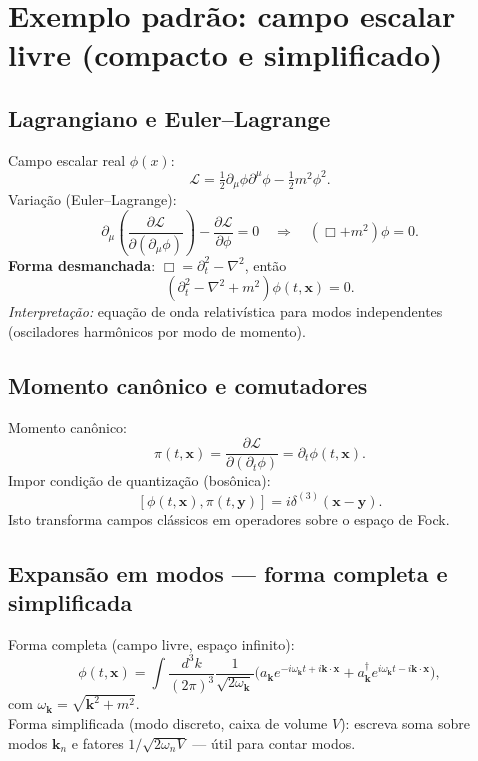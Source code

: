 \documentclass[12pt,a4paper]{article}
\begin{document}
\section{Exemplo padrão: campo escalar livre (compacto e simplificado)}
\subsection{Lagrangiano e Euler--Lagrange}
Campo escalar real $\phi(x)$:
\begin{equation}\label{lag_scalar}
\mathcal{L} = \tfrac12\partial_\mu\phi\partial^\mu\phi - \tfrac12 m^2\phi^2.
\end{equation}
Varia\c{c}\~ao (Euler--Lagrange):
\[ \partial_\mu\left(\frac{\partial\mathcal{L}}{\partial(\partial_\mu\phi)}\right)-\frac{\partial\mathcal{L}}{\partial\phi}=0 \quad\Rightarrow\quad (\Box + m^2)\phi=0. \]
\textbf{Forma desmanchada}: $\Box=\partial_t^2-\nabla^2$, ent\~ao
\[ (\partial_t^2 - \nabla^2 + m^2)\phi(t,\mathbf{x})=0.\]
\textit{Interpreta\c{c}\~ao:} equa\c{c}\~ao de onda relativ\'istica para modos independentes (osciladores harm\^onicos por modo de momento). 

\subsection{Momento canônico e comutadores}
Momento canônico:
\[ \pi(t,\mathbf{x}) = \frac{\partial\mathcal{L}}{\partial(\partial_t\phi)} = \partial_t\phi(t,\mathbf{x}). \]
Impor condi\c{c}\~ao de quantiza\c{c}\~ao (bosônica):
\begin{equation}\label{canonical_commutator}
[\phi(t,\mathbf{x}),\pi(t,\mathbf{y})] = i\delta^{(3)}(\mathbf{x}-\mathbf{y}).
\end{equation}
Isto transforma campos clássicos em operadores sobre o espaço de Fock.

\subsection{Expansão em modos — forma completa e simplificada}
Forma completa (campo livre, espaço infinito):
\begin{equation}\label{mode_expansion_full}
\phi(t,\mathbf{x}) = \int\frac{d^3k}{(2\pi)^3}\frac{1}{\sqrt{2\omega_{\mathbf{k}}}}\big(a_{\mathbf{k}}e^{-i\omega_{\mathbf{k}}t+i\mathbf{k}\cdot\mathbf{x}} + a^\dagger_{\mathbf{k}}e^{i\omega_{\mathbf{k}}t-i\mathbf{k}\cdot\mathbf{x}}\big),
\end{equation}
com $\omega_{\mathbf{k}}=\sqrt{\mathbf{k}^2+m^2}$.\\
Forma simplificada (modo discreto, caixa de volume $V$): escreva soma sobre modos $\mathbf{k}_n$ e fatores $1/\sqrt{2\omega_n V}$ — útil para contar modos.
\end{document}
